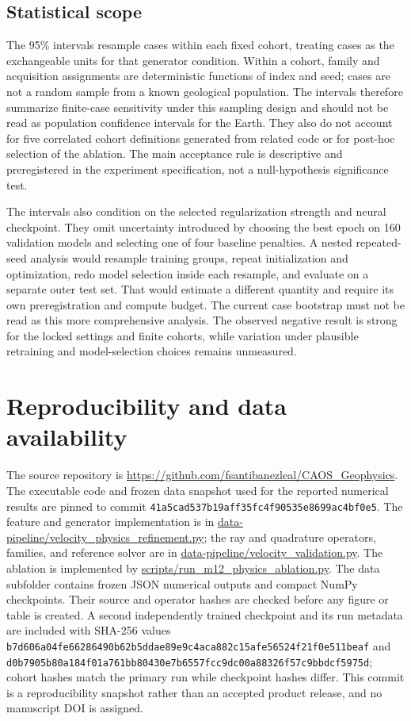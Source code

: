 \documentclass[11pt]{article}
\begin{document}
\subsection{Statistical scope}
\label{sec:statistical-limits}
The 95\% intervals resample cases within each fixed cohort, treating cases as the exchangeable units for that generator condition. Within a cohort, family and acquisition assignments are deterministic functions of index and seed; cases are not a random sample from a known geological population. The intervals therefore summarize finite-case sensitivity under this sampling design and should not be read as population confidence intervals for the Earth. They also do not account for five correlated cohort definitions generated from related code or for post-hoc selection of the ablation. The main acceptance rule is descriptive and preregistered in the experiment specification, not a null-hypothesis significance test.

The intervals also condition on the selected regularization strength and neural checkpoint. They omit uncertainty introduced by choosing the best epoch on 160 validation models and selecting one of four baseline penalties. A nested repeated-seed analysis would resample training groups, repeat initialization and optimization, redo model selection inside each resample, and evaluate on a separate outer test set. That would estimate a different quantity and require its own preregistration and compute budget. The current case bootstrap must not be read as this more comprehensive analysis. The observed negative result is strong for the locked settings and finite cohorts, while variation under plausible retraining and model-selection choices remains unmeasured.

\section{Reproducibility and data availability}
\label{sec:reproducibility}
The source repository is \url{https://github.com/fsantibanezleal/CAOS_Geophysics}. The executable code and frozen data snapshot used for the reported numerical results are pinned to commit \texttt{41a5cad537b19aff35fc4f90535e8699ac4bf0e5}. The feature and generator implementation is in \url{data-pipeline/velocity_physics_refinement.py}; the ray and quadrature operators, families, and reference solver are in \url{data-pipeline/velocity_validation.py}. The ablation is implemented by \url{scripts/run_m12_physics_ablation.py}. The data subfolder contains frozen JSON numerical outputs and compact NumPy checkpoints. Their source and operator hashes are checked before any figure or table is created. A second independently trained checkpoint and its run metadata are included with SHA-256 values \texttt{b7d606a04fe66286490b62b5ddae89e9c4aca882c15afe56524f21f0e511beaf} and \texttt{d0b7905b80a184f01a761bb80430e7b6557fcc9dc00a88326f57c9bbdcf5975d}; cohort hashes match the primary run while checkpoint hashes differ. This commit is a reproducibility snapshot rather than an accepted product release, and no manuscript DOI is assigned.
\end{document}

